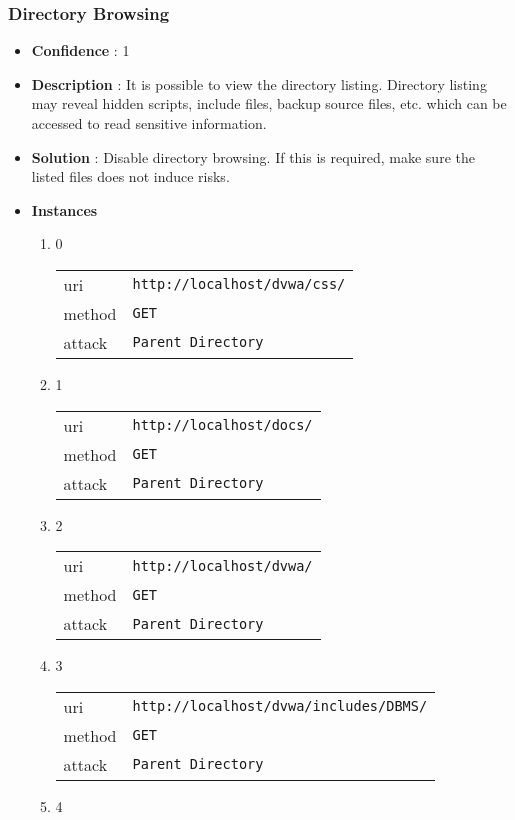 \documentclass[10pt]{article}
\begin{document}
\subsubsection{Directory Browsing}
\begin{itemize}
\item[] \textbf{Confidence} : 1
\item[] \textbf{Description} : It is possible to view the directory listing.  Directory listing may reveal hidden scripts, include files, backup source files, etc. which can be accessed to read sensitive information.
\item[] \textbf{Solution} :  Disable directory browsing.  If this is required, make sure the listed files does not induce risks.
\item[] \textbf{Instances}
\begin{enumerate}
\item[] 0
\begin{tabular}{| l | p{12cm}}
uri & \texttt{http://localhost/dvwa/css/} \\
method & \texttt{GET} \\
attack & \texttt{Parent Directory} \\
\end{tabular}
\item[] 1
\begin{tabular}{| l | p{12cm}}
uri & \texttt{http://localhost/docs/} \\
method & \texttt{GET} \\
attack & \texttt{Parent Directory} \\
\end{tabular}
\item[] 2
\begin{tabular}{| l | p{12cm}}
uri & \texttt{http://localhost/dvwa/} \\
method & \texttt{GET} \\
attack & \texttt{Parent Directory} \\
\end{tabular}
\item[] 3
\begin{tabular}{| l | p{12cm}}
uri & \texttt{http://localhost/dvwa/includes/DBMS/} \\
method & \texttt{GET} \\
attack & \texttt{Parent Directory} \\
\end{tabular}
\item[] 4
\begin{tabular}{| l | p{12cm}}

\end{tabular}
\end{enumerate}
\end{itemize}
\end{document}
